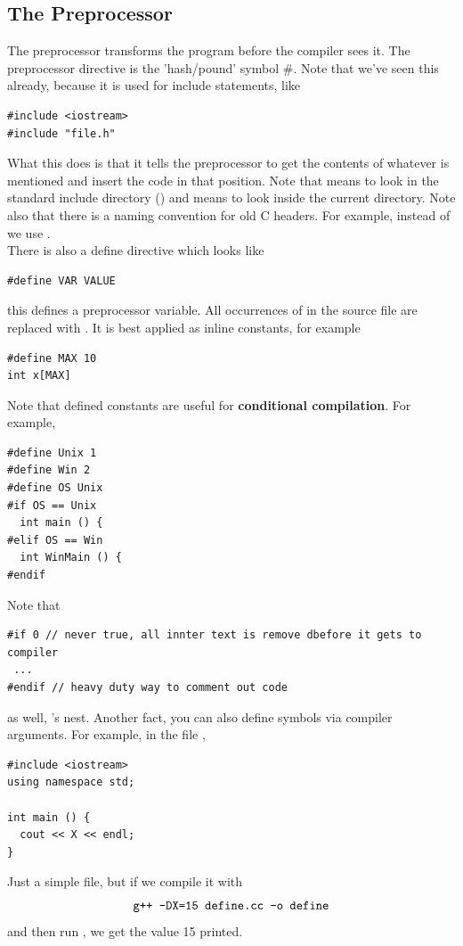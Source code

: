 \documentclass[english, 11pt]{article}
\begin{document}
\subsection{The Preprocessor}

The preprocessor transforms the program before the compiler sees it. The preprocessor directive is the 'hash/pound' symbol $\#$. Note that we've seen this already, because it is used for include statements, like
\begin{lstlisting}
#include <iostream>
#include "file.h"
\end{lstlisting}
What this does is that it tells the preprocessor to get the contents of whatever is mentioned and insert the code in that position. Note that  means to look in the standard include directory () and  means to look inside the current directory. Note also that there is a naming convention for old C headers. For example, instead of  we use . \\

There is also a define directive which looks like
\begin{lstlisting}
#define VAR VALUE
\end{lstlisting}
this defines a preprocessor variable. All occurrences of  in the source file are replaced with . It is best applied as inline constants, for example
\begin{lstlisting}
#define MAX 10
int x[MAX]
\end{lstlisting}
Note that defined constants are useful for \textbf{conditional compilation}. For example,
\begin{lstlisting}
#define Unix 1
#define Win 2
#define OS Unix
#if OS == Unix
  int main () {
#elif OS == Win
  int WinMain () {
#endif
\end{lstlisting}
Note that
\begin{lstlisting}
#if 0 // never true, all innter text is remove dbefore it gets to compiler
 ...
#endif // heavy duty way to comment out code
\end{lstlisting}
as well, 's nest. Another fact, you can also define symbols via compiler arguments. For example, in the file ,
\begin{lstlisting}
#include <iostream>
using namespace std;

int main () {
  cout << X << endl;
}
\end{lstlisting}
Just a simple file, but if we compile it with
\[ \mbox{\texttt{g++ -DX=15 define.cc -o define}} \]
and then run , we get the value 15 printed. \\
\end{document}
